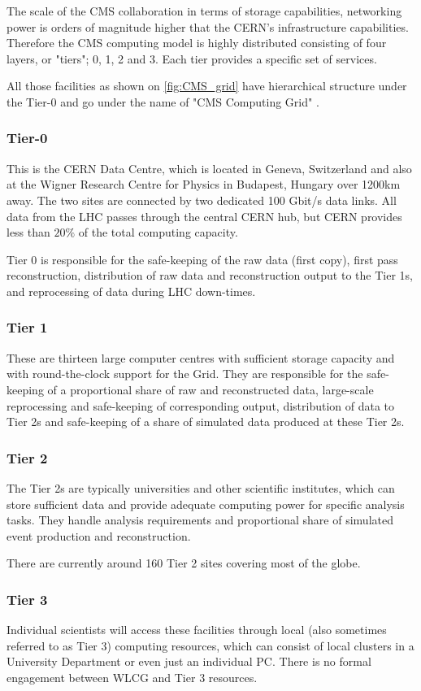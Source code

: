 The scale of the CMS collaboration in terms of storage capabilities, networking power is orders of magnitude higher that the CERN's infrastructure capabilities. Therefore the CMS computing model is highly distributed consisting of four layers, or "tiers"; 0, 1, 2 and 3. Each tier provides a specific set of services.

All those facilities as shown on \autoref{fig:CMS_grid} have hierarchical structure under the Tier-0 and go under the name of "CMS Computing Grid" \cite{Charlot:2003vy}.

\subsubsection{Tier-0}

This is the CERN Data Centre, which is located in Geneva, Switzerland and also at the Wigner Research Centre for Physics in Budapest, Hungary over 1200km away. The two sites are connected by two dedicated 100 Gbit/s data links. All data from the LHC passes through the central CERN hub, but CERN provides less than $20\%$ of the total computing capacity.

Tier 0 is responsible for the safe-keeping of the raw data (first copy), first pass reconstruction, distribution of raw data and reconstruction output to the Tier 1s, and reprocessing of data during LHC down-times.

\subsubsection{Tier 1}

These are thirteen large computer centres with sufficient storage capacity and with round-the-clock support for the Grid. They are responsible for the safe-keeping of a proportional share of raw and reconstructed data, large-scale reprocessing and safe-keeping of corresponding output, distribution of data to Tier 2s and safe-keeping of a share of simulated data produced at these Tier 2s.

\subsubsection{Tier 2}

The Tier 2s are typically universities and other scientific institutes, which can store sufficient data and provide adequate computing power for specific analysis tasks. They handle analysis requirements and proportional share of simulated event production and reconstruction.

There are currently around 160 Tier 2 sites covering most of the globe.

\subsubsection{Tier 3}

Individual scientists will access these facilities through local (also sometimes referred to as Tier 3) computing resources, which can consist of local clusters in a University Department or even just an individual PC. There is no formal engagement between WLCG and Tier 3 resources. 

